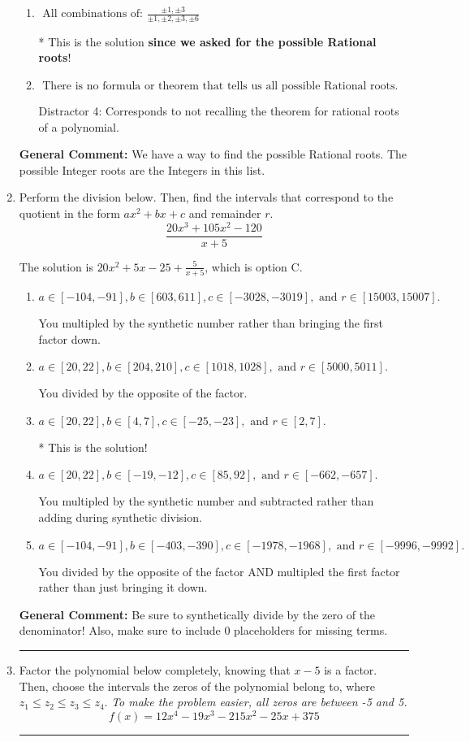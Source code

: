 \documentclass{extbook}[14pt]
\newcommand{\litem}[1]{\item #1

\rule{\textwidth}{0.4pt}}
\begin{document}
\begin{enumerate}
{\begin{enumerate}[label=\Alph*.]
 Distractor 3: Corresponds to the plus or minus of the inverse quotient (an/a0) of the factors. 
\item \( \text{ All combinations of: }\frac{\pm 1,\pm 3}{\pm 1,\pm 2,\pm 3,\pm 6} \)

* This is the solution \textbf{since we asked for the possible Rational roots}!
\item \( \text{ There is no formula or theorem that tells us all possible Rational roots.} \)

 Distractor 4: Corresponds to not recalling the theorem for rational roots of a polynomial.
\end{enumerate}

\textbf{General Comment:} We have a way to find the possible Rational roots. The possible Integer roots are the Integers in this list.
}
\litem{
Perform the division below. Then, find the intervals that correspond to the quotient in the form $ax^2+bx+c$ and remainder $r$.
\[ \frac{20x^{3} +105 x^{2} -120}{x + 5} \]

The solution is \( 20x^{2} +5 x -25 + \frac{5}{x + 5} \), which is option C.\begin{enumerate}[label=\Alph*.]
\item \( a \in [-104, -91], b \in [603, 611], c \in [-3028, -3019], \text{ and } r \in [15003, 15007]. \)

 You multipled by the synthetic number rather than bringing the first factor down.
\item \( a \in [20, 22], b \in [204, 210], c \in [1018, 1028], \text{ and } r \in [5000, 5011]. \)

 You divided by the opposite of the factor.
\item \( a \in [20, 22], b \in [4, 7], c \in [-25, -23], \text{ and } r \in [2, 7]. \)

* This is the solution!
\item \( a \in [20, 22], b \in [-19, -12], c \in [85, 92], \text{ and } r \in [-662, -657]. \)

 You multipled by the synthetic number and subtracted rather than adding during synthetic division.
\item \( a \in [-104, -91], b \in [-403, -390], c \in [-1978, -1968], \text{ and } r \in [-9996, -9992]. \)

 You divided by the opposite of the factor AND multipled the first factor rather than just bringing it down.
\end{enumerate}

\textbf{General Comment:} Be sure to synthetically divide by the zero of the denominator! Also, make sure to include 0 placeholders for missing terms.
}
\litem{
Factor the polynomial below completely, knowing that $x-5$ is a factor. Then, choose the intervals the zeros of the polynomial belong to, where $z_1 \leq z_2 \leq z_3 \leq z_4$. \textit{To make the problem easier, all zeros are between -5 and 5.}
\[ f(x) = 12x^{4} -19 x^{3} -215 x^{2} -25 x + 375 \]

}
\end{enumerate}
\end{document}

